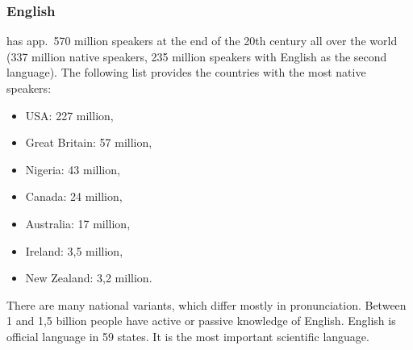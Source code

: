 \subsubsection{English}

 has app.\ 570 million speakers at the end of the 20th century all over the world (337
million native speakers, 235 million speakers with English as the second language). The following
list provides the countries with the most native speakers: 
\begin{itemize}
\item USA: 227 million,
\item Great Britain: 57 million,
\item Nigeria: 43 million, 
\item Canada: 24 million,
\item Australia: 17 million,
\item Ireland: 3,5 million,
\item New Zealand: 3,2 million.
\end{itemize}
There are many national variants, which differ mostly in pronunciation.
Between 1 and  1,5 billion people have active or passive knowledge of English.
English is official language in 59 states. It is the most important scientific language.





